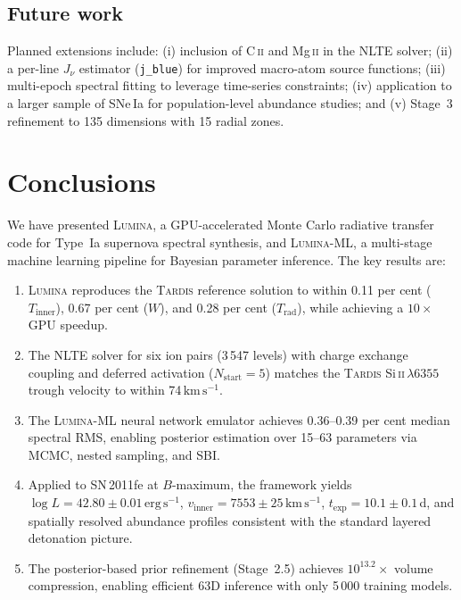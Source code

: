 \documentclass[fleqn,usenatbib]{mnras}
\newcommand{\lumina}{\textsc{Lumina}}
\newcommand{\luminaml}{\textsc{Lumina-ML}}
\newcommand{\tardis}{\textsc{Tardis}}
\newcommand{\kms}{\ensuremath{\,\mathrm{km\,s^{-1}}}}
\newcommand{\ergs}{\ensuremath{\,\mathrm{erg\,s^{-1}}}}
\newcommand{\SiII}{Si\,\textsc{ii}}
\begin{document}
\subsection{Future work}
\label{sec:future}

Planned extensions include: (i) inclusion of C\,\textsc{ii} and Mg\,\textsc{ii} in the NLTE solver; (ii) a per-line $J_\nu$ estimator (\texttt{j\_blue}) for improved macro-atom source functions; (iii) multi-epoch spectral fitting to leverage time-series constraints; (iv) application to a larger sample of SNe\,Ia for population-level abundance studies; and (v) Stage~3 refinement to 135 dimensions with 15 radial zones.


\section{Conclusions}
\label{sec:conclusions}

We have presented \lumina{}, a GPU-accelerated Monte Carlo radiative transfer code for Type~Ia supernova spectral synthesis, and \luminaml{}, a multi-stage machine learning pipeline for Bayesian parameter inference. The key results are:

\begin{enumerate}
    \item \lumina{} reproduces the \tardis{} reference solution to within 0.11 per cent ($T_\mathrm{inner}$), 0.67 per cent ($W$), and 0.28 per cent ($T_\mathrm{rad}$), while achieving a $10\times$ GPU speedup.

    \item The NLTE solver for six ion pairs (3\,547 levels) with charge exchange coupling and deferred activation ($N_\mathrm{start} = 5$) matches the \tardis{} \SiII{}\,$\lambda 6355$ trough velocity to within 74\kms.

    \item The \luminaml{} neural network emulator achieves 0.36--0.39 per cent median spectral RMS, enabling posterior estimation over 15--63 parameters via MCMC, nested sampling, and SBI.

    \item Applied to SN\,2011fe at $B$-maximum, the framework yields $\log L = 42.80 \pm 0.01\ergs$, $v_\mathrm{inner} = 7553 \pm 25\kms$, $t_\mathrm{exp} = 10.1 \pm 0.1$\,d, and spatially resolved abundance profiles consistent with the standard layered detonation picture.

    \item The posterior-based prior refinement (Stage~2.5) achieves $10^{13.2}\times$ volume compression, enabling efficient 63D inference with only 5\,000 training models.
\end{enumerate}
\end{document}
